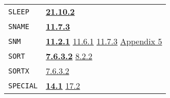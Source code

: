 \documentclass[a4paper,]{article}
\begin{document}
\begin{longtable}[]{@{}ll@{}}
\begin{minipage}[t]{0.24\columnwidth}\raggedright\strut
\texttt{SLEEP}\strut
\end{minipage} & \begin{minipage}[t]{0.70\columnwidth}\raggedright\strut
\textbf{\href{21-interrupts.md\#21102-sleep}{21.10.2}}\strut
\end{minipage}\tabularnewline
\begin{minipage}[t]{0.24\columnwidth}\raggedright\strut
\texttt{SNAME}\strut
\end{minipage} & \begin{minipage}[t]{0.70\columnwidth}\raggedright\strut
\textbf{\href{11-input-output.md\#1173-sname}{11.7.3}}\strut
\end{minipage}\tabularnewline
\begin{minipage}[t]{0.24\columnwidth}\raggedright\strut
\texttt{SNM}\strut
\end{minipage} & \begin{minipage}[t]{0.70\columnwidth}\raggedright\strut
\textbf{\href{11-input-output.md\#1121-open}{11.2.1}} \href{11-input-output.md\#1161-save}{11.6.1}
\href{11-input-output.md\#1173-sname}{11.7.3} \href{appendix-5-initial-settings.md\#appendix-5-initial-settings}{Appendix
5}\strut
\end{minipage}\tabularnewline
\begin{minipage}[t]{0.24\columnwidth}\raggedright\strut
\texttt{SORT}\strut
\end{minipage} & \begin{minipage}[t]{0.70\columnwidth}\raggedright\strut
\textbf{\href{07-structured-objects.md\#7632-sort}{7.6.3.2}} \href{08-truth.md\#822-equality-and-membership-1}{8.2.2}\strut
\end{minipage}\tabularnewline
\begin{minipage}[t]{0.24\columnwidth}\raggedright\strut
\texttt{SORTX}\strut
\end{minipage} & \begin{minipage}[t]{0.70\columnwidth}\raggedright\strut
\href{07-structured-objects.md\#7632-sort}{7.6.3.2}\strut
\end{minipage}\tabularnewline
\begin{minipage}[t]{0.24\columnwidth}\raggedright\strut
\texttt{SPECIAL}\strut
\end{minipage} & \begin{minipage}[t]{0.70\columnwidth}\raggedright\strut
\textbf{\href{14-data-type-declarations.md\#141-patterns}{14.1}} \href{17-macro-operations.md\#172-eval-macros}{17.2}

\end{minipage}
\end{longtable}
\end{document}
